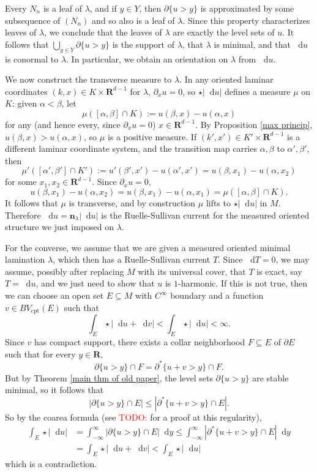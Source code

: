 \documentclass[reqno,11pt]{amsart}
\newcommand{\RR}{\mathbf{R}}
\newcommand*\dif{\mathop{}\!\mathrm{d}}
\newcommand{\normal}{\mathbf n}
\newcommand{\cpt}{\mathrm{cpt}}
\theoremstyle{definition}
\numberwithin{equation}{section}
\newcommand\todo[1]{\textcolor{red}{TODO: #1}}
\begin{document}
Every $N_n$ is a leaf of $\lambda$, and if $y \in Y$, then $\partial \{u > y\}$ is approximated by some subsequence of $(N_n)$ and so also is a leaf of $\lambda$.
Since this property characterizes leaves of $\lambda$, we conclude that the leaves of $\lambda$ are exactly the level sets of $u$.
It follows that $\bigcup_{y \in Y} \partial \{u > y\}$ is the support of $\lambda$, that $\lambda$ is minimal, and that $\dif u$ is conormal to $\lambda$.
In particular, we obtain an orientation on $\lambda$ from $\dif u$.

We now construct the transverse measure to $\lambda$.
In any oriented laminar coordinates $(k, x) \in K \times \RR^{d - 1}$ for $\lambda$, $\partial_x u = 0$, so $\star |\dif u|$ defines a measure $\mu$ on $K$: given $\alpha < \beta$, let
$$\mu([\alpha, \beta] \cap K) := u(\beta, x) - u(\alpha, x)$$
for any (and hence every, since $\partial_x u = 0$) $x \in \RR^{d - 1}$.
By Proposition \ref{max princip}, $u(\beta, x) > u(\alpha, x)$, so $\mu$ is a positive measure.
If $(k', x') \in K' \times \RR^{d - 1}$ is a different laminar coordinate system, and the transition map carries $\alpha, \beta$ to $\alpha', \beta'$, then
$$\mu'([\alpha', \beta'] \cap K') := u'(\beta', x') - u(\alpha', x') = u(\beta, x_1) - u(\alpha, x_2)$$
for some $x_1, x_2 \in \RR^{d - 1}$. Since $\partial_x u = 0$,
$$u(\beta, x_1) - u(\alpha, x_2) = u(\beta, x_1) - u(\alpha, x_1) = \mu([\alpha, \beta] \cap K).$$
It follows that $\mu$ is transverse, and by construction $\mu$ lifts to $\star |\dif u|$ in $M$.
Therefore $\dif u = \normal_\lambda |\dif u|$ is the Ruelle-Sullivan current for the measured oriented structure we just imposed on $\lambda$.

For the converse, we assume that we are given a measured oriented minimal lamination $\lambda$, which then has a Ruelle-Sullivan current $T$.
Since $\dif T = 0$, we may assume, possibly after replacing $M$ with its universal cover, that $T$ is exact, say $T = \dif u$, and we just need to show that $u$ is $1$-harmonic.
If this is not true, then we can choose an open set $E \subseteq M$ with $C^\infty$ boundary and a function $v \in BV_\cpt(E)$ such that
$$\int_E \star |\dif u + \dif v| < \int_E \star |\dif u| < \infty.$$
Since $v$ has compact support, there exists a collar neighborhood $F \subseteq E$ of $\partial E$ such that for every $y \in \RR$,
$$\partial \{u > y\} \cap F = \partial^* \{u + v > y\} \cap F.$$
But by Theorem \ref{main thm of old paper}, the level sets $\partial \{u > y\}$ are stable minimal, so it follows that
$$|\partial \{u > y\} \cap E| \leq |\partial^* \{u + v > y\} \cap E|.$$
So by the coarea formula (see \todo{\cite{BackusFLG}} for a proof at this regularity),
\begin{align*}
\int_E \star |\dif u| &= \int_{-\infty}^\infty |\partial \{u > y\} \cap E| \dif y \leq \int_{-\infty}^\infty |\partial^* \{u + v > y\} \cap E| \dif y \\
&= \int_E \star |\dif u + \dif v| < \int_E \star |\dif u|
\end{align*}
which is a contradiction.
\end{document}

